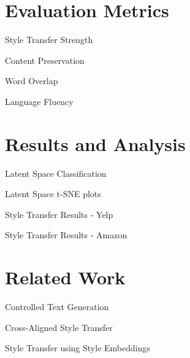 \documentclass[aspectratio=169]{beamer}
\begin{document}
% 

\section{Evaluation Metrics}

\begin{frame}{Style Transfer Strength}
\end{frame}

\begin{frame}{Content Preservation}
\end{frame}

\begin{frame}{Word Overlap}
\end{frame}

\begin{frame}{Language Fluency}
\end{frame}

% 

\section{Results and Analysis}

\begin{frame}{Latent Space Classification}
\end{frame}

\begin{frame}{Latent Space t-SNE plots}
\end{frame}

\begin{frame}{Style Transfer Results - Yelp}
\end{frame}

\begin{frame}{Style Transfer Results - Amazon}
\end{frame}

% 

\section{Related Work}

\begin{frame}{Controlled Text Generation}
\end{frame}

\begin{frame}{Cross-Aligned Style Transfer}
\end{frame}

\begin{frame}{Style Transfer using Style Embeddings}
\end{frame}
\end{document}
